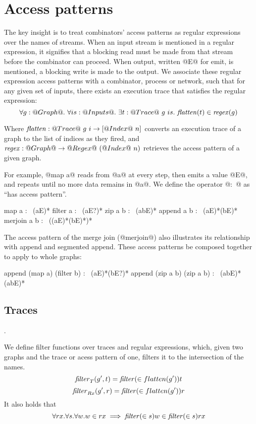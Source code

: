\section{Access patterns}
\label{s:Access}

The key insight is to treat combinators' access patterns as regular expressions over the names of streams.
When an input stream is mentioned in a regular expression, it signifies that a blocking read must be made from that stream before the combinator can proceed.
When output, written @E@ for emit, is mentioned, a blocking write is made to the output.
We associate these regular expression access patterns with a combinator, process or network, such that for any given set of inputs, there exists an execution trace that satisfies the regular expression:
\[ \forall g : @Graph@.~ \forall is : @Inputs@.~ \exists t : @Trace@~g~is.~
    \mathit{flatten}(t) \in \mathit{regex}(g) \]

Where $\mathit{flatten} : @Trace@~g~i \to [@Index@~n]$ converts an execution trace of a graph to the list of indices as they fired, and $\mathit{regex} : @Graph@ \to @Regex@~(@Index@~n)$ retrieves the access pattern of a given graph.

For example, @map a@ reads from @a@ at every step, then emits a value @E@, and repeats until no more data remains in @a@.
We define the operator @:~@ as ``has access pattern''.
\begin{code}
map     a   :~ (aE)*
filter  a   :~ (aE?)*
zip     a b :~ (abE)*
append  a b :~ (aE)*(bE)*
merjoin a b :~ ((aE)*(bE)*)*
\end{code}
The access pattern of the merge join (@merjoin@) also illustrates its relationship with append and segmented append.
These access patterns be composed together to apply to whole graphs:

\begin{code}
append (map a) (filter b) :~ (aE)*(bE?)*
append (zip a b) (zip a b) :~ (abE)*(abE)*
\end{code}

\subsection{Traces}
.

We define filter functions over traces and regular expressions, which, given two graphs and the trace or acess pattern of one, filters it to the intersection of the names.
\[ \mathit{filter}_{T}(g', t) = \mathit{filter} (\in flatten(g')) t \]
\[ \mathit{filter}_{Rx}(g', r) = \mathit{filter} (\in flatten(g')) r \]
It also holds that
\[ \forall rx. \forall s. \forall w. w \in rx \implies \mathit{filter}(\in s) w \in \mathit{filter}(\in s) rx\]

